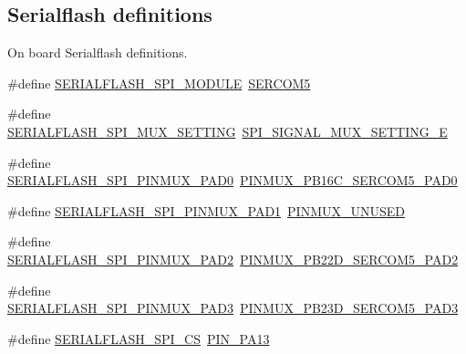 \subsection*{Serialflash definitions}
\label{_amgrp7dd27d17a145ac62f4ab60cb835043c3}%
On board Serialflash definitions. \begin{DoxyCompactItemize}
\item 
\#define \mbox{\hyperlink{group__samd21__xplained__pro__features__group_gae325d728c5fc955184481e874d57c12e}{S\+E\+R\+I\+A\+L\+F\+L\+A\+S\+H\+\_\+\+S\+P\+I\+\_\+\+M\+O\+D\+U\+LE}}~\mbox{\hyperlink{group___s_a_m_d21_j18_a__base_ga8785a316e608cb0a218f2a59655d6037}{S\+E\+R\+C\+O\+M5}}
\item 
\#define \mbox{\hyperlink{group__samd21__xplained__pro__features__group_gab49e06266be48c912fa081c1e22d8ae5}{S\+E\+R\+I\+A\+L\+F\+L\+A\+S\+H\+\_\+\+S\+P\+I\+\_\+\+M\+U\+X\+\_\+\+S\+E\+T\+T\+I\+NG}}~\mbox{\hyperlink{group__asfdoc__sam0__sercom__spi__group_gga420e19efe4a923eb9ab6dc619a23c370a7234b3f4e0aa7fe723cc85edabea9816}{S\+P\+I\+\_\+\+S\+I\+G\+N\+A\+L\+\_\+\+M\+U\+X\+\_\+\+S\+E\+T\+T\+I\+N\+G\+\_\+E}}
\item 
\#define \mbox{\hyperlink{group__samd21__xplained__pro__features__group_gacd9ea905d55421c82110effaf070bfed}{S\+E\+R\+I\+A\+L\+F\+L\+A\+S\+H\+\_\+\+S\+P\+I\+\_\+\+P\+I\+N\+M\+U\+X\+\_\+\+P\+A\+D0}}~\mbox{\hyperlink{pio_2samd21j18a_8h_aeae967081710a10f32df07c0c02b3d7b}{P\+I\+N\+M\+U\+X\+\_\+\+P\+B16\+C\+\_\+\+S\+E\+R\+C\+O\+M5\+\_\+\+P\+A\+D0}}
\item 
\#define \mbox{\hyperlink{group__samd21__xplained__pro__features__group_ga159d75d00043239a6219995b41a4e3e9}{S\+E\+R\+I\+A\+L\+F\+L\+A\+S\+H\+\_\+\+S\+P\+I\+\_\+\+P\+I\+N\+M\+U\+X\+\_\+\+P\+A\+D1}}~\mbox{\hyperlink{group__asfdoc__sam0__sercom__usart__group_gaffde9ff712058ef836127e1f3368889e}{P\+I\+N\+M\+U\+X\+\_\+\+U\+N\+U\+S\+ED}}
\item 
\#define \mbox{\hyperlink{group__samd21__xplained__pro__features__group_ga4e09c8a5a9802d2c644c95f681cc684c}{S\+E\+R\+I\+A\+L\+F\+L\+A\+S\+H\+\_\+\+S\+P\+I\+\_\+\+P\+I\+N\+M\+U\+X\+\_\+\+P\+A\+D2}}~\mbox{\hyperlink{pio_2samd21j18a_8h_a50be2bec24a1ecdce31937a77ab5d09f}{P\+I\+N\+M\+U\+X\+\_\+\+P\+B22\+D\+\_\+\+S\+E\+R\+C\+O\+M5\+\_\+\+P\+A\+D2}}
\item 
\#define \mbox{\hyperlink{group__samd21__xplained__pro__features__group_ga715e11bd5a7ced8c14477567d7a26f84}{S\+E\+R\+I\+A\+L\+F\+L\+A\+S\+H\+\_\+\+S\+P\+I\+\_\+\+P\+I\+N\+M\+U\+X\+\_\+\+P\+A\+D3}}~\mbox{\hyperlink{pio_2samd21j18a_8h_a55272a225c5d8830c891785a6e06c3f4}{P\+I\+N\+M\+U\+X\+\_\+\+P\+B23\+D\+\_\+\+S\+E\+R\+C\+O\+M5\+\_\+\+P\+A\+D3}}
\item 
\#define \mbox{\hyperlink{group__samd21__xplained__pro__features__group_ga5b501e0aa033a8282d91fe663e9c7bf9}{S\+E\+R\+I\+A\+L\+F\+L\+A\+S\+H\+\_\+\+S\+P\+I\+\_\+\+CS}}~\mbox{\hyperlink{pio_2samd21j18a_8h_a4180bdc6fd7252cff2ffe28176866028}{P\+I\+N\+\_\+\+P\+A13}}
\end{DoxyCompactItemize}
